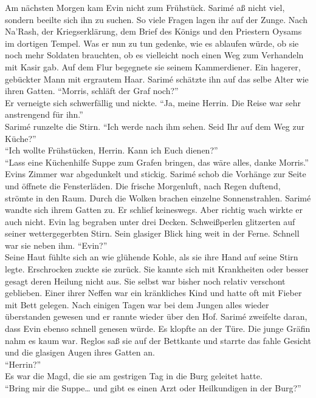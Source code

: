 Am nächsten Morgen kam Evin nicht zum Frühstück. Sarimé aß nicht viel, sondern beeilte sich ihn zu 
suchen. So viele Fragen lagen ihr auf der Zunge. Nach Na'Rash, der Kriegserklärung, dem Brief des 
Königs und den Priestern Oysams im dortigen Tempel. Was er nun zu tun gedenke, wie es ablaufen 
würde, ob sie noch mehr Soldaten brauchten, ob es vielleicht noch einen Weg zum Verhandeln mit 
Kasir 
gab. Auf dem Flur begegnete sie seinem Kammerdiener. Ein hagerer, gebückter Mann mit ergrautem 
Haar. Sarimé schätzte ihn auf das selbe Alter wie ihren Gatten. ``Morris, schläft der Graf noch?''\\
Er verneigte sich schwerfällig und nickte. ``Ja, meine Herrin. Die Reise war sehr anstrengend für 
ihn.''\\
Sarimé runzelte die Stirn. ``Ich werde nach ihm sehen. Seid Ihr auf dem Weg zur Küche?''\\
``Ich wollte Frühstücken, Herrin. Kann ich Euch dienen?''\\
``Lass eine Küchenhilfe Suppe zum Grafen bringen, das wäre alles, danke Morris.''\\
Evins Zimmer war abgedunkelt und stickig. Sarimé schob die Vorhänge zur Seite und öffnete die 
Fensterläden. Die frische Morgenluft, nach Regen duftend, strömte in den Raum. Durch die Wolken 
brachen einzelne Sonnenstrahlen. Sarimé wandte sich ihrem Gatten zu. Er schlief keineswegs. Aber 
richtig wach wirkte er auch nicht. Evin lag begraben unter drei Decken. Schweißperlen glitzerten 
auf 
seiner wettergegerbten Stirn. Sein glasiger Blick hing weit in der Ferne. Schnell war sie neben 
ihm. ``Evin?''\\
Seine Haut fühlte sich an wie glühende Kohle, als sie ihre Hand auf seine Stirn legte. Erschrocken 
zuckte sie zurück. Sie kannte sich mit Krankheiten oder besser gesagt deren Heilung nicht aus. Sie 
selbst war bisher noch relativ verschont geblieben. Einer ihrer Neffen war ein kränkliches Kind und 
hatte oft mit Fieber mit Bett gelegen. Nach einigen Tagen war bei dem Jungen alles wieder 
überstanden gewesen und er rannte wieder über den Hof. Sarimé zweifelte daran, dass Evin ebenso 
schnell genesen würde. Es klopfte an der Türe. Die junge Gräfin nahm es kaum war. Reglos saß sie 
auf der Bettkante und starrte das fahle Gesicht und die glasigen Augen ihres Gatten an.\\
``Herrin?''\\
Es war die Magd, die sie am gestrigen Tag in die Burg geleitet hatte.\\
``Bring mir die Suppe… und gibt es einen Arzt oder Heilkundigen in der Burg?''\\
